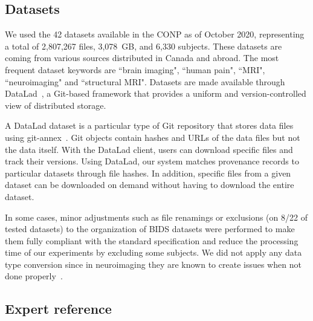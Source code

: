 \documentclass[conference]{IEEEtran}
\begin{document}
\subsection{Datasets} 

We used the 42 datasets available in the CONP as of October 2020,
representing a total of 2,807,267 files, 3,078~GB, and 6,330 subjects.
These datasets are coming from various sources distributed in Canada and abroad. The most frequent dataset keywords are ``brain imaging", ``human pain", ``MRI", ``neuroimaging" and ``structural MRI".
 Datasets are made available through DataLad~\cite{datalad2021},
a Git-based framework that provides a uniform and version-controlled view of
distributed storage.

A DataLad dataset is a particular type of Git repository that stores
 data files using git-annex~\cite{gitannex}. Git objects contain
hashes and URLs of the data files but not the data itself. With the DataLad
client, users can download specific files and track their versions. Using
DataLad, our system matches provenance records to particular datasets
through file hashes. In addition, specific files from a given dataset can
be downloaded on demand without having to download the entire dataset. 

 In some cases, minor adjustments such as file renamings or exclusions (on 8/22 of tested datasets) to the organization of BIDS datasets were performed to make them fully compliant with the standard specification and reduce the processing time of our experiments by excluding some subjects. We did not apply any data type conversion since in neuroimaging they are known to create issues when not done properly~\cite{li2016first}. 



\subsection{Expert reference}
\end{document}

